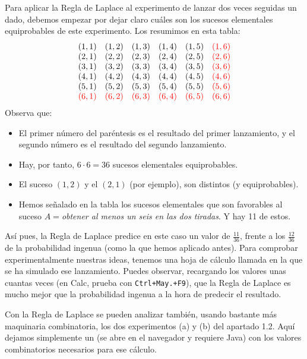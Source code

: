\begin{itemize}
         Para aplicar la Regla de Laplace al experimento de lanzar dos veces seguidas un dado, debemos empezar por dejar claro cuáles son los sucesos elementales equiprobables de este experimento. Los resumimos en esta tabla:
        \[
            \begin{array}{cccccc}
            (1,1)&(1,2)&(1,3)&(1,4)&(1,5)&\textcolor{red}{(1,6)}\\
            (2,1)&(2,2)&(2,3)&(2,4)&(2,5)&\textcolor{red}{(2,6)}\\
            (3,1)&(3,2)&(3,3)&(3,4)&(3,5)&\textcolor{red}{(3,6)}\\
            (4,1)&(4,2)&(4,3)&(4,4)&(4,5)&\textcolor{red}{(4,6)}\\
            (5,1)&(5,2)&(5,3)&(5,4)&(5,5)&\textcolor{red}{(5,6)}\\
            \textcolor{red}{(6,1)}&\textcolor{red}{(6,2)}&\textcolor{red}{(6,3)}&\textcolor{red}{(6,4)}&\textcolor{red}{(6,5)}&\textcolor{red}{(6,6)}
            \end{array}
        \]
        Observa que:
        \begin{itemize}
            \item El primer número del paréntesis es el resultado del primer lanzamiento, y el segundo número es el resultado del segundo lanzamiento.
            \item Hay, por tanto, $6\cdot 6=36$ sucesos elementales equiprobables.
            \item El suceso $(1,2)$ y el $(2,1)$ (por ejemplo), son distintos (y equiprobables).
            \item Hemos señalado en la tabla los sucesos elementales que son favorables al suceso $A=${\em obtener al menos un seis en las dos tiradas}. Y hay 11 de estos.
        \end{itemize}
        Así pues, la Regla de Laplace predice en este caso un valor de $\frac{11}{36}$, frente a los $\frac{12}{36}$ de la probabilidad ingenua (como la que hemos aplicado antes). Para comprobar experimentalmente nuestras ideas, tenemos una hoja de cálculo llamada  en la que se ha simulado ese lanzamiento. Puedes observar, recargando los valores unas cuantas veces (en Calc, prueba con {\tt Ctrl+May.+F9}), que la Regla de Laplace es mucho mejor que la probabilidad ingenua a la hora de predecir el resultado.


         Con la Regla de Laplace se pueden analizar también, usando bastante más maquinaria combinatoria, los dos experimentos (a) y (b) del apartado 1.2. Aquí dejamos simplemente un   (se abre en el navegador y requiere Java) con los valores combinatorios necesarios para ese cálculo.


\end{itemize}
